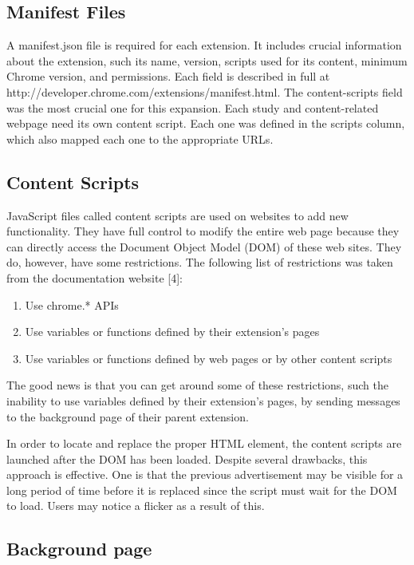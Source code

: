 \subsection{Manifest Files}

A manifest.json file is required for each extension. It includes crucial information about the extension, such its name, version, scripts used for its content, minimum Chrome version, and permissions. Each field is described in full at http://developer.chrome.com/extensions/manifest.html. The content-scripts field was the most crucial one for this expansion. Each study and content-related webpage need its own content script. Each one was defined in the scripts column, which also mapped each one to the appropriate URLs.

\subsection{Content Scripts}

JavaScript files called content scripts are used on websites to add new functionality. They have full control to modify the entire web page because they can directly access the Document Object Model (DOM) of these web sites. They do, however, have some restrictions. The following list of restrictions was taken from the documentation website [4]:

\begin{enumerate}
  \item Use chrome.* APIs
  \item Use variables or functions defined by their extension's pages
  \item Use variables or functions defined by web pages or by other content scripts
\end{enumerate}

The good news is that you can get around some of these restrictions, such the inability to use variables defined by their extension's pages, by sending messages to the background page of their parent extension.

In order to locate and replace the proper HTML element, the content scripts are launched after the DOM has been loaded. Despite several drawbacks, this approach is effective. One is that the previous advertisement may be visible for a long period of time before it is replaced since the script must wait for the DOM to load. Users may notice a flicker as a result of this.

\subsection{Background page}

